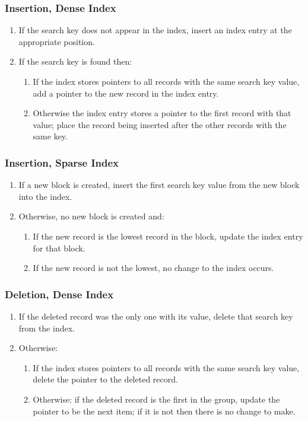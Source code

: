 \begin{frame}
\frametitle{Insertion, Dense Index}

\begin{enumerate}
	\item If the search key does not appear in the index, insert an index entry at the appropriate position.
	\item If the search key is found then:
		\begin{enumerate}
			\item If the index stores pointers to all records with the same search key value, add a pointer to the new record in the index entry.
			\item Otherwise the index entry stores a pointer to the first record with that value; place the record being inserted after the other records with the same key.
		\end{enumerate}
\end{enumerate}


\end{frame}

\begin{frame}
\frametitle{Insertion, Sparse Index}

\begin{enumerate}
	\item If a new block is created, insert the first search key value from the new block into the index.
	\item Otherwise, no new block is created and:
		\begin{enumerate}
			\item If the new record is the lowest record in the block, update the index entry for that block.
			\item If the new record is not the lowest, no change to the index occurs.
		\end{enumerate}
\end{enumerate}

\end{frame}

\begin{frame}
\frametitle{Deletion, Dense Index}


\begin{enumerate}
	\item If the deleted record was the only one with its value, delete that search key from the index.
	\item Otherwise:
		\begin{enumerate}
			\item If the index stores pointers to all records with the same search key value, delete the pointer to the deleted record.
			\item Otherwise: if the deleted record is the first in the group, update the pointer to be the next item; if it is not then there is no change to make.
		\end{enumerate}
\end{enumerate}

\end{frame}


